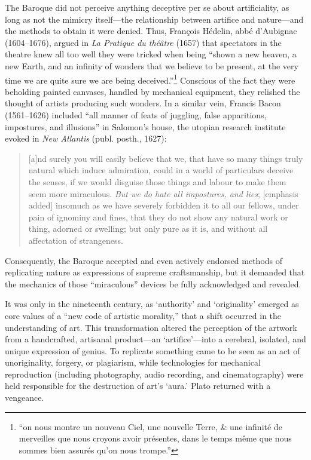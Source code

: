 \documentclass{article}
\begin{document}
The Baroque did not perceive anything deceptive per se about artificiality, as long as not the mimicry itself—the relationship between artifice and nature—and the methods to obtain it were denied. Thus, François Hédelin, abbé d’Aubignac (1604–1676), argued in \textit{La Pratique du théâtre} (1657) that spectators in the theatre knew all too well they were tricked when being “shown a new heaven, a new Earth, and an infinity of wonders that we believe to be present, at the very time we are quite sure we are being deceived.”\footnote{“on nous montre un nouveau Ciel, une nouvelle Terre, \& une infinité de merveilles que nous croyons avoir présentes, dans le temps même que nous sommes bien assurés qu’on nous trompe.”} Conscious of the fact they were beholding painted canvases, handled by mechanical equipment, they relished the thought of artists producing such wonders. In a similar vein, Francis Bacon (1561–1626) included “all manner of feats of juggling, false apparitions, impostures, and illusions” in Salomon’s house, the utopian research institute evoked in \textit{New Atlantis} (publ. posth., 1627):

\begin{quote}
[a]nd surely you will easily believe that we, that have so many things truly natural which induce admiration, could in a world of particulars deceive the senses, if we would disguise those things and labour to make them seem more miraculous. \textit{But we do hate all impostures, and lies}; [emphasis added] insomuch as we have severely forbidden it to all our fellows, under pain of ignominy and fines, that they do not show any natural work or thing, adorned or swelling; but only pure as it is, and without all affectation of strangeness. \cite[p. 40]{baconNewAtlantis2020}
\end{quote}

Consequently, the Baroque accepted and even actively endorsed methods of replicating nature as expressions of supreme craftsmanship, but it demanded that the mechanics of those “miraculous” devices be fully acknowledged and revealed.

It was only in the nineteenth century, as ‘authority’ and ‘originality’ emerged as core values of a “new code of artistic morality,”\cite[p. 319]{collingwoodPrinciplesArt1958} that a shift occurred in the understanding of art. This transformation altered the perception of the artwork from a handcrafted, artisanal product—an ‘artifice’—into a cerebral, isolated, and unique expression of genius. To replicate something came to be seen as an act of unoriginality, forgery, or plagiarism,\cite{dutton1983forger} while technologies for mechanical reproduction (including photography, audio recording, and cinematography) were held responsible for the destruction of art’s ‘aura.’\cite{benjamin1936kunstwerk} Plato returned with a vengeance.  
\end{document}
